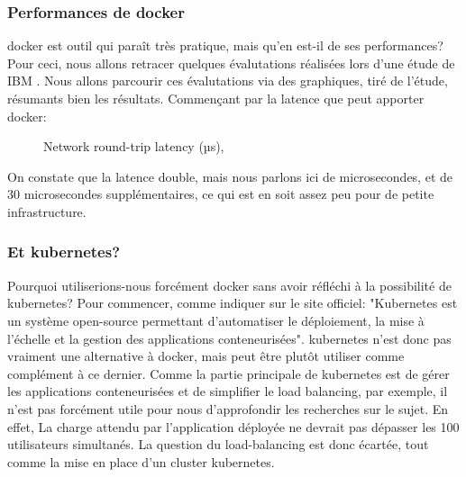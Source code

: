 \documentclass[
    iai, %
    il, %
]{heig-tb}
\begin{document}
\subsubsection{Performances de \Gls{docker}}
\Gls{docker} est outil qui paraît très pratique, mais qu'en est-il de ses performances?
Pour ceci, nous allons retracer quelques évalutations réalisées lors d'une étude de IBM \cite{felter2015updated}. Nous allons parcourir ces évalutations via des graphiques, tiré de l'étude, résumants bien les résultats.
Commençant par la latence que peut apporter \Gls{docker}:
\begin{figure}
    \caption{Network round-trip latency (µs), \cite{rad2017introduction}}
\end{figure}

On constate que la latence double, mais nous parlons ici de microsecondes, et de 30 microsecondes supplémentaires, ce qui est en soit assez peu pour de petite infrastructure.




\subsubsection{Et \Gls{kubernetes}?}
Pourquoi utiliserions-nous forcément \Gls{docker} sans avoir réfléchi à la possibilité de \Gls{kubernetes}?
Pour commencer, comme indiquer sur le site officiel:
"Kubernetes est un système open-source permettant d'automatiser le déploiement, la mise à l'échelle et la gestion des applications conteneurisées".
\Gls{kubernetes} n'est donc pas vraiment une alternative à \Gls{docker}, mais peut être plutôt utiliser comme complément à ce dernier.
Comme la partie principale de \Gls{kubernetes} est de gérer les applications conteneurisées et de simplifier le load balancing, par exemple, il n'est pas forcément utile pour nous d'approfondir les recherches sur le sujet.
En effet, La charge attendu par l'application déployée ne devrait pas dépasser les 100 utilisateurs simultanés. La question du load-balancing est donc écartée, tout comme la mise en place d'un cluster \Gls{kubernetes}.
\end{document}
